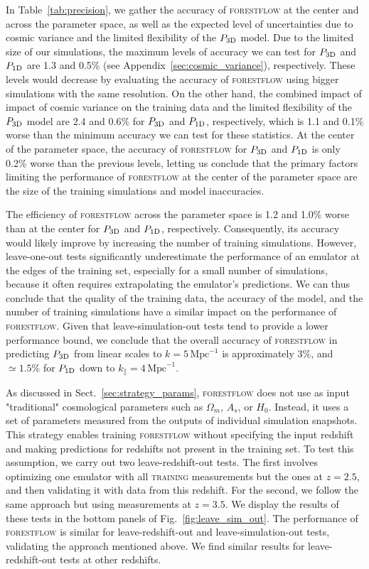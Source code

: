 \documentclass[longauth]{aa}
\newcommand{\poned}{\ensuremath{P_{\rm 1D}}\xspace}
\newcommand{\pthreed}{\ensuremath{P_{\rm 3D}}\xspace}
\newcommand{\forestflow}{\textsc{forestflow}\xspace}
\newcommand{\lacehc}{\textsc{training}\xspace}
\newcommand{\iMpc}{\ensuremath{\,\mathrm{Mpc}^{-1}}}
\begin{document}
In Table~\ref{tab:precision}, we gather the accuracy of \forestflow at the center and across the parameter space, as well as the expected level of uncertainties due to cosmic variance and the limited flexibility of the \pthreed model. Due to the limited size of our simulations, the maximum levels of accuracy we can test for \pthreed and \poned are 1.3 and 0.5\% (see Appendix~\ref{sec:cosmic_variance}), respectively. These levels would decrease by evaluating the accuracy of \forestflow using bigger simulations with the same resolution. On the other hand, the combined impact of impact of cosmic variance on the training data and the limited flexibility of the \pthreed model are 2.4 and 0.6\% for \pthreed and \poned, respectively, which is 1.1 and 0.1\% worse than the minimum accuracy we can test for these statistics. At the center of the parameter space, the accuracy of \forestflow for \pthreed and \poned is only 0.2\% worse than the previous levels, letting us conclude that the primary factors limiting the performance of \forestflow at the center of the parameter space are the size of the training simulations and model inaccuracies. 

The efficiency of \forestflow across the parameter space is 1.2 and 1.0\% worse than at the center for \pthreed and \poned, respectively. Consequently, its accuracy would likely improve by increasing the number of training simulations. However, leave-one-out tests significantly underestimate the performance of an emulator at the edges of the training set, especially for a small number of simulations, because it often requires extrapolating the emulator's predictions. We can thus conclude that the quality of the training data, the accuracy of the model, and the number of training simulations have a similar impact on the performance of \forestflow. Given that leave-simulation-out tests tend to provide a lower performance bound, we conclude that the overall accuracy of \forestflow in predicting \pthreed from linear scales to $k=5\iMpc$ is approximately 3\%, and $\simeq1.5\%$ for \poned down to $k_\parallel=4\iMpc$.

As discussed in Sect.~\ref{sec:strategy_params}, \forestflow does not use as input "traditional" cosmological parameters such as $\Omega_m$, $A_s$, or $H_0$. Instead, it uses a set of parameters measured from the outputs of individual simulation snapshots. This strategy enables training \forestflow without specifying the input redshift and making predictions for redshifts not present in the training set. To test this assumption, we carry out two leave-redshift-out tests. The first involves optimizing one emulator with all \lacehc measurements but the ones at $z=2.5$, and then validating it with data from this redshift. For the second, we follow the same approach but using measurements at $z=3.5$. We display the results of these tests in the bottom panels of Fig.~\ref{fig:leave_sim_out}. The performance of \forestflow is similar for leave-redshift-out and leave-simulation-out tests, validating the approach mentioned above. We find similar results for leave-redshift-out tests at other redshifts.
\end{document}
